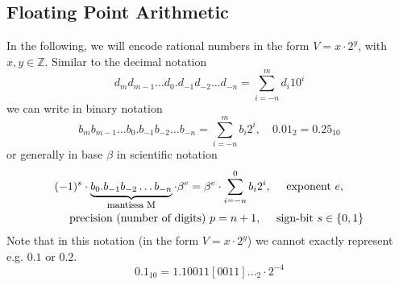 \subsection{Floating Point Arithmetic}
In the following, we will encode rational numbers in the form $V = x \cdot 2^y$, with $x,y \in \mathbb{Z}$. Similar to the decimal notation
\begin{equation}
    d_m d_{m-1} \dots d_0 . d_{-1} d_{-2} \dots d_{-n} = \sum_{i=-n}^m d_i 10^i
\end{equation}
we can write in binary notation
\begin{equation}
    b_m b_{m-1} \dots b_0 . b_{-1} b_{-2} \dots b_{-n} = \sum_{i=-n}^m b_i 2^i, \quad 0.01_2 = 0.25_{10}
\end{equation}
or generally in base $\beta$ in scientific notation
\begin{equation}
    \begin{multlined}
        (-1) ^ s \cdot \explain{b_0 . b_{-1} b_{-2} \dots b_{-n}}{mantissa M} \cdot \beta^e = \beta^e \cdot \sum_{i=-n}^0 b_i 2^i, \quad \text{ exponent } e,\\ \text{ precision (number of digits) } p = n+1, \quad \text{ sign-bit } s \in \{0,1\}
    \end{multlined}
\end{equation}
Note that in this notation (in the form $V = x \cdot 2^y$) we cannot exactly represent e.g. $0.1$ or $0.2$.
\begin{equation}
    0.1_{10} = 1.10011[0011]\dots_2 \cdot 2^{-4}
\end{equation}

